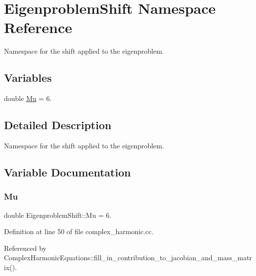 \hypertarget{namespaceEigenproblemShift}{}\section{Eigenproblem\+Shift Namespace Reference}
\label{namespaceEigenproblemShift}


Namespace for the shift applied to the eigenproblem.  


\subsection*{Variables}
\begin{DoxyCompactItemize}
\item 
double \hyperlink{namespaceEigenproblemShift_a82e816b5ecba937123c65c5bd953a2fb}{Mu} = 6.
\end{DoxyCompactItemize}


\subsection{Detailed Description}
Namespace for the shift applied to the eigenproblem. 

\subsection{Variable Documentation}
\mbox{\label{namespaceEigenproblemShift_a82e816b5ecba937123c65c5bd953a2fb}} 
\subsubsection{\texorpdfstring{Mu}{Mu}}
{\footnotesize\ttfamily double Eigenproblem\+Shift\+::\+Mu = 6.}



Definition at line 50 of file complex\+\_\+harmonic.\+cc.



Referenced by Complex\+Harmonic\+Equations\+::fill\+\_\+in\+\_\+contribution\+\_\+to\+\_\+jacobian\+\_\+and\+\_\+mass\+\_\+matrix().

